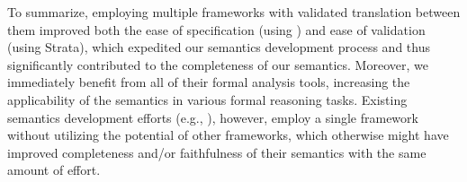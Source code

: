 To summarize, employing multiple frameworks with validated translation between them improved both the ease of specification (using \K) and ease of validation (using Strata), which expedited our semantics development process and thus significantly contributed to the completeness of our semantics. Moreover, we immediately benefit from all of their formal analysis tools, increasing the applicability of the semantics in various formal reasoning tasks. Existing semantics development efforts (e.g., \cite{Goel:FMCAD14,Heule2016a}), however, %
employ a single framework without utilizing the potential of other frameworks, which otherwise might have improved completeness and/or faithfulness of their semantics with the same amount of effort.
%
